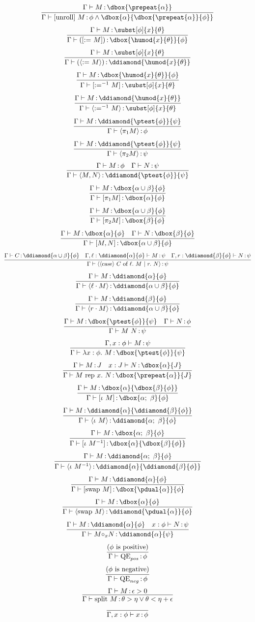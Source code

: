 \documentclass[12pt]{cmuthesis}
\theoremstyle{definition}
\theoremstyle{remark}
\begin{document}
\[\infer{\proves{\G}{\ebunroll{M}}{\phi \land \dbox{\alpha}{\dbox{\prepeat{\alpha}}{\phi}}}}
        {\proves{\G}{M}{\dbox{\prepeat{\alpha}}}}\]
\[\infer{\proves{\G}{(\ebasgn{M})}{\dbox{\humod{x}{\theta}}{\phi}}}
        {\proves{\G}{M}{\subst[\phi]{x}{\theta}}}\]
\[\infer{\proves{\G}{(\edasgn{M})}{\ddiamond{\humod{x}{\theta}}}}
        {\proves{\G}{M}{\subst[\phi]{x}{\theta}}}\]
\[\infer{\proves{\G}{\ebasgninv{M}}{\subst[\phi]{x}{\theta}}}
        {\proves{\G}{M}{\dbox{\humod{x}{\theta}}{\phi}}}\]
\[\infer{\proves{\G}{\edasgninv{M}}{\subst[\phi]{x}{\theta}}}
        {\proves{\G}{M}{\ddiamond{\humod{x}{\theta}}}}\]
\[\infer{\proves{\G}{\edprojL{M}}{\phi}}
        {\proves{\G}{M}{\ddiamond{\ptest{\phi}}{\psi}}}\]
\[\infer{\proves{\G}{\edprojR{M}}{\psi}}
        {\proves{\G}{M}{\ddiamond{\ptest{\phi}}{\psi}}}\]
\[\infer{\proves{\G}{\edcons{M}{N}}{\ddiamond{\ptest{\phi}}{\psi}}}
        {\proves{\G}{M}{\phi} & \proves{\G}{N}{\psi}}\]
\[\infer{\proves{\G}{\ebprojL{M}}{\dbox{\alpha}{\phi}}}
        {\proves{\G}{M}{\dbox{\alpha\cup\beta}{\phi}}}\]
\[\infer{\proves{\G}{\ebprojR{M}}{\dbox{\beta}{\phi}}}
        {\proves{\G}{M}{\dbox{\alpha\cup\beta}{\phi}}}\]
\[\infer{\proves{\G}{\ebcons{M}{N}}{\dbox{\alpha\cup\beta}{\phi}}}
        {\proves{\G}{M}{\dbox{\alpha}{\phi}} & \proves{\G}{N}{\dbox{\beta}{\phi}}}\]
\[\infer{\proves{\G}{\edcase{C}{M}{N}}{\psi}}
        {\proves{\G}{C}{\ddiamond{\alpha\cup\beta}{\phi}}
        &\proves{\G,\ell:\ddiamond{\alpha}{\phi}}{M}{\psi}
        &\proves{\G,r:\ddiamond{\beta}{\phi}}{N}{\psi}}\]
\[\infer{\proves{\G}{\edinjL{M}}{\ddiamond{\alpha\cup\beta}{\phi}}}
        {\proves{\G}{M}{\ddiamond{\alpha}{\phi}}}\]
\[\infer{\proves{\G}{\edinjR{M}}{\ddiamond{\alpha\cup\beta}{\phi}}}
        {\proves{\G}{M}{\ddiamond{\beta}{\phi}}}\]
\[\infer{\proves{\G}{\eapp{M}{N}}{\psi}}
        {\proves{\G}{M}{\dbox{\ptest{\phi}}{\psi}} 
        &\proves{\G}{N}{\phi}}\]
\[\infer{\proves{\G}{\elam{\phi}{M}}{\dbox{\ptest{\phi}}{\psi}}}
        {\proves{\G,x:\phi}{M}{\psi}}\]
\[\infer{\proves{\G}{\erep{M}{N}{x}}{\dbox{\prepeat{\alpha}}{J}}}
        {\proves{\G}{M}{J} & \proves{x:J}{N}{\dbox{\alpha}{J}}}\]
\[\infer{\proves{\G}{\ebseq{M}}{\dbox{\alpha;~\beta}{\phi}}}
        {\proves{\G}{M}{\dbox{\alpha}{\dbox{\beta}{\phi}}}}\]
\[\infer{\proves{\G}{\edseq{M}}{\ddiamond{\alpha;~\beta}{\phi}}}
        {\proves{\G}{M}{\ddiamond{\alpha}{\ddiamond{\beta}{\phi}}}}\]
\[\infer{\proves{\G}{\ebseqinv{M}}{\dbox{\alpha}{\dbox{\beta}{\phi}}}}
        {\proves{\G}{M}{\dbox{\alpha;~\beta}{\phi}}}\]
\[\infer{\proves{\G}{\edseqinv{M}}{\ddiamond{\alpha}{\ddiamond{\beta}{\phi}}}}
        {\proves{\G}{M}{\ddiamond{\alpha;~\beta}{\phi}}}\]
\[\infer{\proves{\G}{\ebswap{M}}{\dbox{\pdual{\alpha}}{\phi}}}
        {\proves{\G}{M}{\ddiamond{\alpha}{\phi}}}\]
\[\infer{\proves{\G}{\edswap{M}}{\ddiamond{\pdual{\alpha}}{\phi}}}
        {\proves{\G}{M}{\dbox{\alpha}{\phi}}}\]
\[\infer{\proves{\G}{\emon{M}{N}{x}}{\ddiamond{\alpha}{\psi}}}
        {\proves{\G}{M}{\ddiamond{\alpha}{\phi}} & \proves{x:\phi}{N}{\psi}}\]
\[\infer{\proves{\G}{\eQEpos}{\phi}}{\text{($\phi$ is positive)}}\]
\[\infer{\proves{\G}{\eQEneg}{\phi}}{\text{($\phi$ is negative)}}\]
\[\infer{\proves{\G}{\esplit{M}}{\theta > \eta \lor \theta < \eta + \epsilon}}
        {\proves{\G}{M}{\epsilon > 0}}\]
\[\infer{\proves{\G,x:\phi}{x}{\phi}}{}\]
\end{document}
